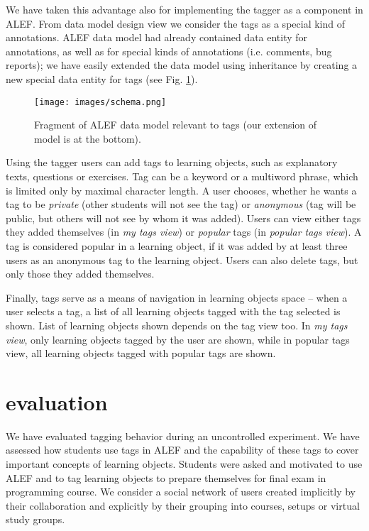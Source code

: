 \documentclass{IEEEtran}     %
\begin{document}
We have taken this advantage also for implementing the
tagger as a component in ALEF. From data model design
view we consider the tags as a special kind of annotations.
ALEF data model had already contained data entity for
annotations, as well as for special kinds of annotations (i.e.
comments, bug reports); we have easily extended the data
model using inheritance by creating a new special data entity
for tags (see Fig. \ref{schema}).

\begin{figure}[h]    %
\centering
\texttt{[image: images/schema.png]}
\centering
\caption{ Fragment of ALEF data model relevant to tags (our extension of model is at the bottom).}
\label{schema}
\end{figure}

Using the tagger users can add tags to learning objects,
such as explanatory texts, questions or exercises. Tag can be
a keyword or a multiword phrase, which is limited only by
maximal character length. A user chooses, whether he wants
a tag to be \textit{private} (other students will not see the tag) or
\textit{anonymous} (tag will be public, but others will not see by
whom it was added). Users can view either tags they added
themselves (in \textit{my tags view}) or \textit{popular} tags (in \textit{popular
tags view}). A tag is considered popular in a learning object,
if it was added by at least three users as an anonymous tag to
the learning object. Users can also delete tags, but only those
they added themselves.

Finally, tags serve as a means of navigation in learning
objects space – when a user selects a tag, a list of all learning
objects tagged with the tag selected is shown. List of
learning objects shown depends on the tag view too. In \textit{my
tags view}, only learning objects tagged by the user are
shown, while in popular tags view, all learning objects
tagged with popular tags are shown.

\section{evaluation}
We have evaluated tagging behavior during an
uncontrolled experiment. We have assessed how students use
tags in ALEF and the capability of these tags to cover
important concepts of learning objects. Students were asked
and motivated to use ALEF and to tag learning objects to
prepare themselves for final exam in programming course.
We consider a social network of users created implicitly by
their collaboration and explicitly by their grouping into
courses, setups or virtual study groups.
\end{document}
